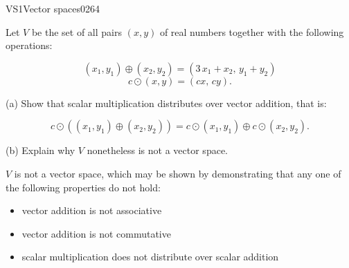 \begin{exercise}{VS1}{Vector spaces}{0264} 
\begin{exerciseStatement} 

 Let \(V\) be the set of all pairs \((x,y)\) of real numbers together with the following operations: 

 \[(x_1,y_1)\oplus (x_2,y_2)=\left(3 \, x_{1} + x_{2},\,y_{1} + y_{2}\right)\]\[c \odot (x,y) =\left(c x,\,c y\right).\] 

 (a) Show that scalar multiplication distributes over vector addition, that is: 

 \[
      c\odot \left((x_1,y_1)\oplus(x_2,y_2)\right)=c\odot(x_1,y_1)\oplus c\odot(x_2,y_2).
    \] 

 (b) Explain why \(V\) nonetheless is not a vector space. 

 \end{exerciseStatement}
 \begin{exerciseAnswer} 

 \(V\) is not a vector space, which may be shown by demonstrating that any one of the following properties do not hold: 

 

\begin{itemize}
\item vector addition is not associative
\item vector addition is not commutative
\item scalar multiplication does not distribute over scalar addition
\end{itemize}

     \end{exerciseAnswer}
 \end{exercise}


\newpage




